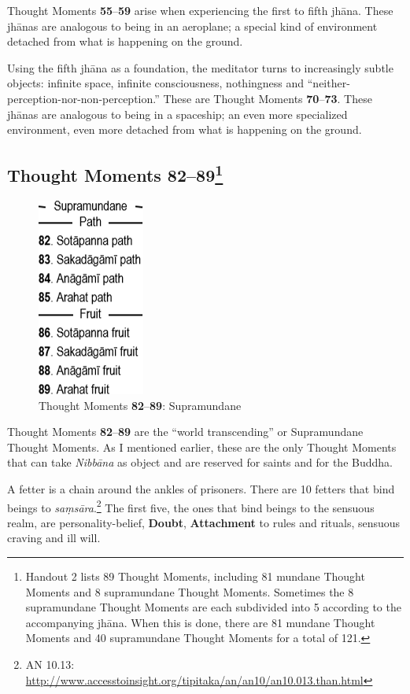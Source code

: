 Thought Moments \textbf{55}--\textbf{59} arise when experiencing the first to fifth jhāna. These jhānas are analogous to being in an aeroplane; a special kind of environment detached from what is happening on the ground.

Using the fifth jhāna as a foundation, the meditator turns to increasingly subtle objects: infinite space, infinite consciousness, nothingness and “neither-perception-nor-non-perception.” These are Thought Moments \textbf{70}--\textbf{73}. These jhānas are analogous to being in a spaceship; an even more specialized environment, even more detached from what is happening on the ground.

\subsection*{Thought Moments 82--89\footnote{Handout 2 lists 89 Thought Moments, including 81 mundane Thought Moments and 8 supramundane Thought Moments. Sometimes the 8 supramundane Thought Moments are each subdivided into 5 according to the accompanying jhāna. When this is done, there are 81 mundane Thought Moments and 40 supramundane Thought Moments for a total of 121.}}

\begin{figure}[h]
\centering
\includegraphics[width=0.19\linewidth]{./Diagrams/82to89}
\caption{Thought Moments \textbf{82}--\textbf{89}: Supramundane}
\label{fig:82to89}
\end{figure}

Thought Moments \textbf{82}--\textbf{89} are the “world transcending” or Supramundane Thought Moments. As I mentioned earlier, these are the only Thought Moments that can take \textit{Nibbāna} as object and are reserved for saints and for the Buddha.

A fetter is a chain around the ankles of prisoners. There are 10 fetters that bind beings to \textit{saṃsāra}.\footnote{AN 10.13: \url{http://www.accesstoinsight.org/tipitaka/an/an10/an10.013.than.html}} The first five, the ones that bind beings to the sensuous realm, are personality-belief, \textbf{Doubt}, \textbf{Attachment} to rules and rituals, sensuous craving and ill will.

